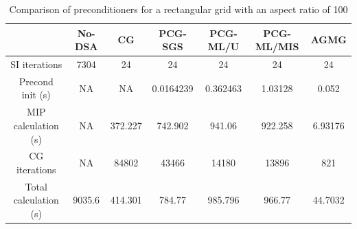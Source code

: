 \begin{table}[!htbp]
  \caption{Comparison of preconditioners for a rectangular grid with an aspect
  ratio of 100}
  \begin{center}
    \begin{tabular}{|c|c|c|c|c|c|c|}
      \hline
       & No-DSA & CG & PCG-SGS & PCG-ML/U & PCG-ML/MIS & AGMG \\
      \hline
      SI iterations & 7304    & 24      & 24        & 24       & 24      & 24 \\
   Precond init (s) & NA      & NA      & 0.0164239 & 0.362463 & 1.03128 & 0.052 \\
MIP calculation (s) & NA      & 372.227 & 742.902   & 941.06   & 922.258 &
      6.93176 \\
      CG iterations & NA      & 84802   & 43466     & 14180    & 13896   & 821 \\
Total calculation (s) & 9035.6 & 414.301 & 784.77   & 985.796  & 966.77  &
      44.7032 \\
      \hline
    \end{tabular}
    \label{table_ar_100}
  \end{center}
\end{table}                  
